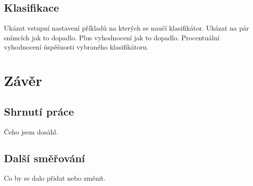 \documentclass[11pt,twoside,a4paper]{book}
\begin{document}
\section{Klasifikace}
Ukázat vstupní nastavení příkladů na kterých se naučí klasifikátor. Ukázat na pár snímcích jak to dopadlo. Plus vyhodnocení jak to dopadlo. Procentuální vyhodnocení úspěšnosti vybraného klasifikátoru.

\chapter{Závěr}
\section{Shrnutí práce}
Čeho jsem dosáhl.

\section{Další směřování}
Co by se dalo přidat nebo změnit.


%




%
{

}

%
\end{document}
